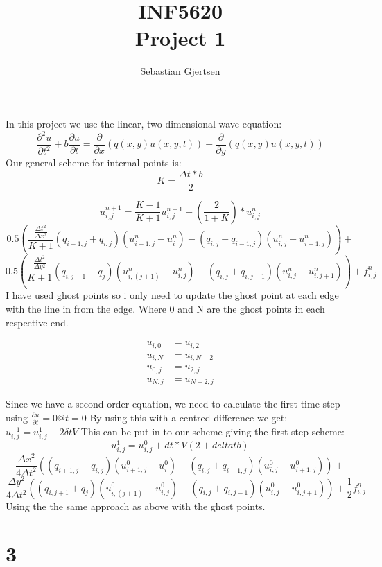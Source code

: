 \documentclass[a4paper,norsk]{article}
\begin{document}
\title{INF5620 \\ Project 1}
\author{Sebastian Gjertsen}

\maketitle
\section*{}
In this project we use the linear, two-dimensional wave equation:
$$\frac{\partial^2 u}{\partial t^2} + b \frac{\partial u}{\partial t} = \frac{\partial }{\partial x}(q(x,y)u(x,y,t)) + \frac{\partial }{\partial y}(q(x,y)u(x,y,t))  $$
Our general scheme for internal points is:
$$K = \frac{\Delta t*b}{2}$$

$$u_{i,j}^{n+1} = \frac{K-1}{K+1}u_{i,j}^{n-1} + (\frac{2}{1+K})*u_{i,j}^n $$
$$0.5(\frac{\frac{\Delta t^2}{\Delta x^2}}{K+1}(q_{i+1,j}+q_{i,j})(u_{i+1,j}^n-u_i^n) - (q_{i,j}+q_{i-1,j})(u_{i,j}^n - u_{i+1,j}^n)) + $$ 
$$0.5(\frac{\frac{\Delta t^2}{\Delta y^2}}{K+1}(q_{i,j+1}+q_{j})(u_{i,(j+1)}^n-u_{i,j}^n) - (q_{i,j}+q_{i,j-1})(u_{i,j}^n - u_{i,j+1}^n)) +f_{i,j}^n $$
I have used ghost points so i only need to update the ghost point at each edge with the line in from the edge. Where 0 and N are the ghost points in each respective end.

\begin{align*}
u_{i,0} &= u_{i,2} \\
u_{i,N} &= u_{i,N-2} \\
u_{0,j} &= u_{2,j} \\
u_{N,j} &= u_{N-2,j}    
\end{align*}


Since we have a second order equation, we need to calculate the first time step using $ \frac{\partial u}{\partial t} = 0 @ t = 0 $
By using this with a centred difference we get: $ u_{i,j}^{-1} = u_{i,j}^1 - 2 \delta tV   $
This can be put in to our scheme giving the first step scheme:
$$u_{i,j}^{1} =  u_{i,j}^0 + dt*V(2+ delta tb) $$
$$\frac{\Delta x^2}{4 \Delta t^2 }((q_{i+1,j}+q_{i,j})(u_{i+1,j}^0-u_i^0) - (q_{i,j}+q_{i-1,j})(u_{i,j}^0 - u_{i+1,j}^0)) + $$ 
$$\frac{\Delta y^2}{4 \Delta t^2 }((q_{i,j+1}+q_{j})(u_{i,(j+1)}^0-u_{i,j}^0) - (q_{i,j}+q_{i,j-1})(u_{i,j}^0 - u_{i,j+1}^0)) +\frac{1}{2}f_{i,j}^n $$
Using the the same approach as above with the ghost points.


\section*{3}
\end{document}
